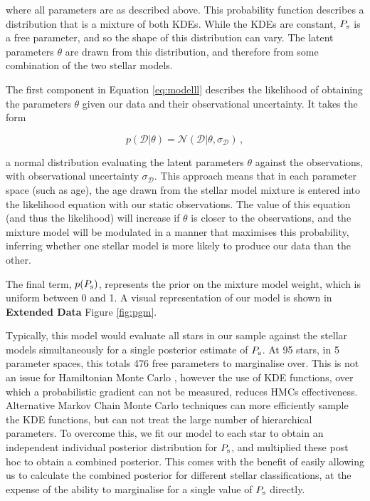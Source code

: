 \noindent where all parameters are as described above. This probability function describes a distribution that is a mixture of both KDEs. While the KDEs are constant, $P_{\rm s}$ is a free parameter, and so the shape of this distribution can vary. The latent parameters $\theta$ are drawn from this distribution, and therefore from some combination of the two stellar models.

The first component in Equation \ref{eq:modelll} describes the likelihood of obtaining the parameters $\theta$ given our data and their observational uncertainty. It takes the form

\begin{equation}
	p(\mathcal{D} | \theta) = \mathcal{N}(\mathcal{D} | \theta, \sigma_{\mathcal{D}})\, ,
\end{equation}

\noindent a normal distribution evaluating the latent parameters $\theta$ against the observations, with observational uncertainty $\sigma_{\mathcal{D}}$. This approach means that in each parameter space (such as age), the age drawn from the stellar model mixture is entered into the likelihood equation with our static observations. The value of this equation (and thus the likelihood) will increase if $\theta$ is closer to the observations, and the mixture model will be modulated in a manner that maximises this probability, inferring whether one stellar model is more likely to produce our data than the other.

The final term, $p(P_{\rm s})$, represents the prior on the mixture model weight, which is uniform between 0 and 1. A visual representation of our model is shown in \textbf{Extended Data} Figure \ref{fig:pgm}.

Typically, this model would evaluate all stars in our sample against the stellar models simultaneously for a single posterior estimate of $P_{\rm s}$. At 95 stars, in 5 parameter spaces, this totals 476 free parameters to marginalise over. This is not an issue for Hamiltonian Monte Carlo \cite[HMC]{m_betancourt+girolami2013}, however the use of KDE functions, over which a probabilistic gradient can not be measured, reduces HMCs effectiveness. Alternative Markov Chain Monte Carlo techniques \cite[MCMC]{m_foreman-mackey+2013} can more efficiently sample the KDE functions, but can not treat the large number of hierarchical parameters. To overcome this, we fit our model to each star to obtain an independent individual posterior distribution for $P_{\rm s}$, and multiplied these post hoc to obtain a combined posterior. This comes with the benefit of easily allowing us to calculate the combined posterior for different stellar classifications, at the expense of the ability to marginalise for a single value of $P_{\rm s}$ directly.\\

